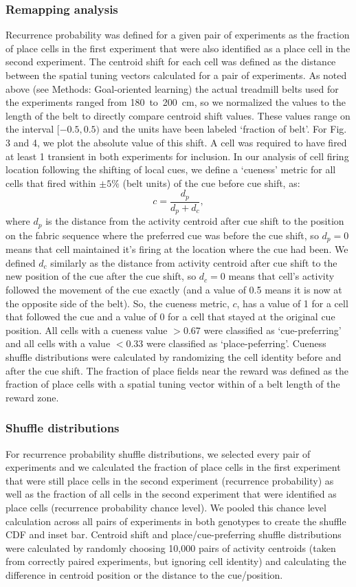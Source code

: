 \subsubsection{Remapping analysis}
Recurrence probability was defined for a given pair of experiments as the fraction of place cells in the first experiment that were also identified as a place cell in the second experiment. The centroid shift for each cell was defined as the distance between the spatial tuning vectors calculated for a pair of experiments. As noted above (see Methods: Goal-oriented learning) the actual treadmill belts used for the experiments ranged from 180~to~200~cm, so we normalized the values to the length of the belt to directly compare centroid shift values. These values range on the interval $[-0.5, 0.5)$ and the units have been labeled `fraction of belt'. For Fig. 3 and 4, we plot the absolute value of this shift. A cell was required to have fired at least 1 transient in both experiments for inclusion. In our analysis of cell firing location following the shifting of local cues, we define a `cueness' metric for all cells that fired within $\pm5\%$ (belt units) of the cue before cue shift, as:
$$c = \frac{d_p}{d_p+d_c},$$
where $d_p$ is the distance from the activity centroid after cue shift to the position on the fabric sequence where the preferred cue was before the cue shift, so $d_p = 0$ means that cell maintained it's firing at the location where the cue had been. We defined $d_c$ similarly as the distance from activity centroid after cue shift to the new position of the cue after the cue shift, so $d_c = 0$ means that cell's activity followed the movement of the cue exactly (and a value of 0.5 means it is now at the opposite side of the belt). So, the cueness metric, $c$, has a value of 1 for a cell that followed the cue and a value of 0 for a cell that stayed at the original cue position. All cells with a cueness value $>$0.67 were classified as `cue-preferring' and all cells with a value $<$0.33 were classified as `place-peferring'. Cueness shuffle distributions were calculated by randomizing the cell identity before and after the cue shift. The fraction of place fields near the reward was defined as the fraction of place cells with a spatial tuning vector within  of a belt length of the reward zone.
\subsubsection{Shuffle distributions}
For recurrence probability shuffle distributions, we selected every pair of experiments and we calculated the fraction of place cells in the first experiment that were still place cells in the second experiment (recurrence probability) as well as the fraction of all cells in the second experiment that were identified as place cells (recurrence probability chance level). We pooled this chance level calculation across all pairs of experiments in both genotypes to create the shuffle CDF and inset bar. Centroid shift and place/cue-preferring shuffle distributions were calculated by randomly choosing 10,000 pairs of activity centroids (taken from correctly paired experiments, but ignoring cell identity) and calculating the difference in centroid position or the distance to the cue/position.

